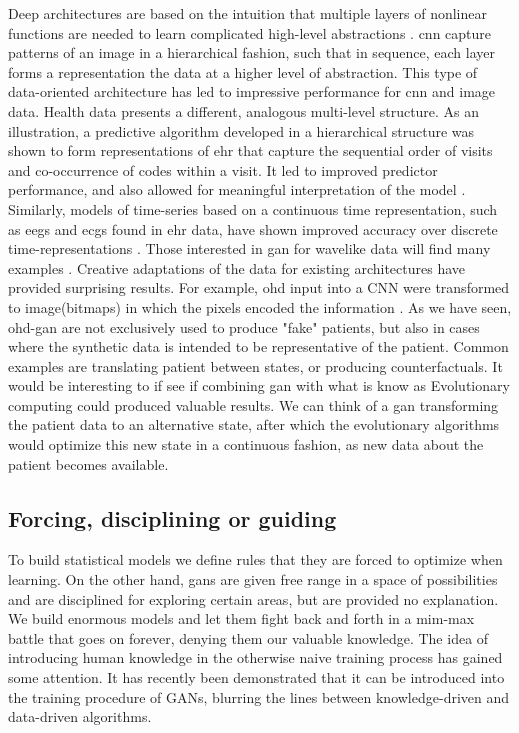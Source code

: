 Deep architectures are based on the intuition that multiple layers of nonlinear functions are needed to learn complicated high-level abstractions \cite{Bengio_2009}. \gls{cnn} capture patterns of an image in a hierarchical fashion, such that in sequence, each layer forms a representation the data at a higher level of abstraction. This type of data-oriented architecture has led to impressive performance for \gls{cnn} and image data. Health data presents a different, analogous multi-level structure. As an illustration, a predictive algorithm developed in a hierarchical structure was shown to form representations of \gls{ehr} that capture the sequential order of visits and co-occurrence of codes within a visit. It led to improved predictor performance, and also allowed for meaningful interpretation of the model \cite{choi2016multi}. Similarly, models of time-series based on a continuous time representation, such as \glspl{eeg} and \glspl{ecg} found in \gls{ehr} data, have shown improved accuracy over discrete time-representations \cite{rubanova2019latent,de2019gru}. Those interested in \gls{gan} for wavelike data will find many examples \cite{Delaney2019,Golany2019,Ye2019,Wang2019d,Singh2020,Aznan2019,Hartmann2018}.  Creative adaptations of the data for existing architectures have provided surprising results. For example, \gls{ohd} input into a CNN were transformed to image(bitmaps) in which the pixels encoded the information \cite{Fukae2020}.
As we have seen, \gls{ohd-gan} are not exclusively used to produce "fake" patients, but also in cases where the synthetic data is intended to be representative of the patient. Common examples are translating patient between states, or producing counterfactuals. It would be interesting to if see if combining \gls{gan} with what is know as Evolutionary computing could produced valuable results. We can think of a \gls{gan} transforming the patient data to an alternative state, after which the evolutionary algorithms would optimize this new state in a continuous fashion, as new data about the patient becomes available.



\subsection{Forcing, disciplining or guiding \label{sec:knowledge}}
To build statistical models we define rules that they are forced to optimize when learning. On the other hand, \glspl{gan} are given free range in a space of possibilities and are disciplined for exploring certain areas, but are provided no explanation. We build enormous models and let them fight back and forth in a mim-max battle that goes on forever, denying them our valuable knowledge. The idea of introducing human knowledge in the otherwise naive training process has gained some attention. It has recently been demonstrated that it can be introduced into the training procedure of GANs, blurring the lines between knowledge-driven and data-driven algorithms.\par

